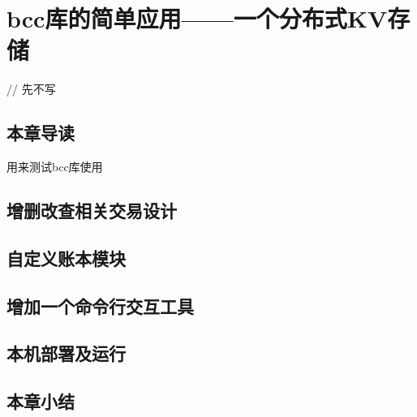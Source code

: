 \chapter{bcc库的简单应用——一个分布式KV存储}
// 先不写


\section{本章导读}

用来测试bcc库使用

\section{增删改查相关交易设计}
\section{自定义账本模块}
\section{增加一个命令行交互工具}

\section{本机部署及运行}

\section{本章小结}
